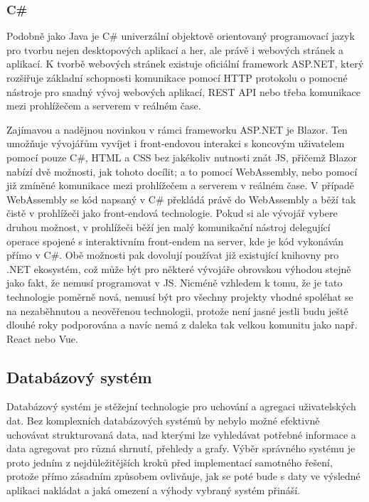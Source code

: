		\subsubsection{C\#}

		Podobně jako Java je C\# univerzální objektově orientovaný programovací jazyk pro tvorbu nejen
		desktopových aplikací a her, ale právě i webových stránek a aplikací.
		K tvorbě webových stránek existuje oficiální framework ASP.NET, který rozšiřuje základní schopnosti
		komunikace pomocí \Ac{HTTP} protokolu o pomocné nástroje pro snadný vývoj webových aplikací, \Ac{REST} API nebo třeba
		komunikace mezi prohlížečem a serverem v reálném čase. \cite{asp_net}

		Zajímavou a nadějnou novinkou v rámci frameworku ASP.NET je Blazor.
		Ten umožňuje vývojářům vyvíjet i front-endovou interakci s koncovým uživatelem pomocí pouze C\#, \Ac{HTML} a \Ac{CSS}
		bez jakékoliv nutnosti znát \ac{JS}, přičemž Blazor nabízí dvě možnosti, jak tohoto docílit; a to pomocí
		WebAssembly, nebo pomocí již zmíněné komunikace mezi prohlížečem a serverem v reálném čase.
		V případě WebAssembly se kód napsaný v C\# překládá právě do WebAssembly a běží tak čistě v prohlížeči
		jako front-endová technologie.
		Pokud si ale vývojář vybere druhou možnost, v prohlížeči běží jen malý komunikační nástroj delegující operace
		spojené s interaktivním front-endem na server, kde je kód vykonáván přímo v C\#.
		Obě možnosti pak dovolují používat již existující knihovny pro .NET ekosystém, což může být pro některé vývojáře
		obrovskou výhodou stejně jako fakt, že nemusí programovat v \ac{JS}.
		Nicméně vzhledem k tomu, že je tato technologie poměrně nová, nemusí být pro všechny projekty vhodné spoléhat
		se na nezaběhnutou a neověřenou technologii, protože není jasné jestli budu ještě dlouhé roky podporována a
		navíc nemá z daleka tak velkou komunitu jako např. React nebo Vue. \cite{blazor}


	\subsection{Databázový systém}

	Databázový systém je stěžejní technologie pro uchování a agregaci uživatelských dat.
	Bez komplexních databázových systémů by nebylo možné efektivně uchovávat strukturovaná data, nad kterými lze vyhledávat potřebné
	informace a data agregovat pro různá shrnutí, přehledy a grafy.
	Výběr správného systému je proto jedním z nejdůležitějších kroků před implementací samotného řešení, protože přímo
	zásadním způsobem ovlivňuje, jak se poté bude s daty ve výsledné aplikaci nakládat a jaká omezení a výhody vybraný
	systém přináší.

